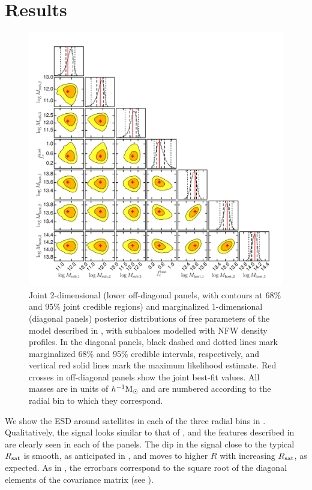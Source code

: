 \section{Results}\label{s:results}

\begin{figure}
 \centerline{\includegraphics[width=\textwidth]{chapter5/corner.pdf}}
\caption{Joint 2-dimensional (lower off-diagonal panels, with contours at 68\% and 95\% joint 
credible regions) and marginalized 1-dimensional (diagonal panels) posterior distributions of free 
parameters of the model described in , with subhaloes modelled with NFW density 
profiles. In the diagonal panels, black dashed and dotted lines mark marginalized 68\% and 95\% 
credible intervals, respectively, and vertical red solid lines mark the maximum likelihood estimate. 
Red crosses in off-diagonal panels show the joint best-fit values. All masses are in units of 
$h^{-1}{\rm M}_\odot$ and are numbered according to the radial bin to which they correspond.}
\label{f:corner}
\end{figure}

We show the ESD around satellites in each of the three radial bins in . 
Qualitatively, the signal looks similar to that of , and the features described in 
 are clearly seen in each of the panels. The dip in the signal close to the typical 
$R_{\rm sat}$ is smooth, as anticipated in , and moves to higher $R$ with increasing 
$R_{\rm sat}$, as expected. As in , the errorbars correspond to the square root of 
the diagonal elements of the covariance matrix (see ).

